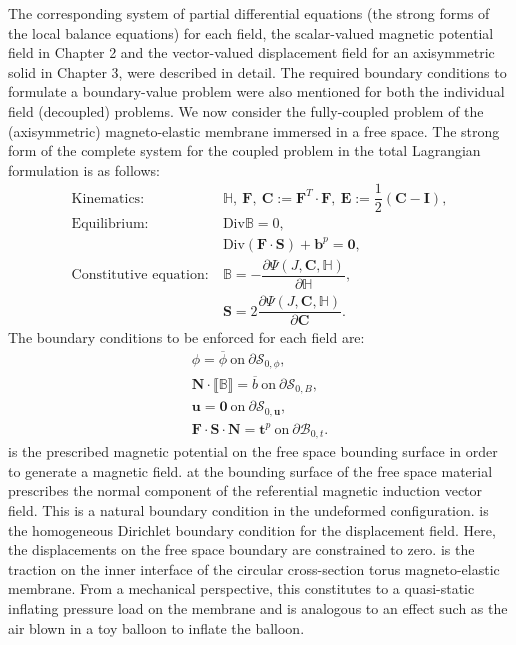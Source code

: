 The corresponding system of partial differential equations (the strong forms of the local balance equations) for each field, the scalar-valued magnetic potential field in Chapter 2 and the vector-valued displacement field for an axisymmetric solid in Chapter 3, were described in detail. The required boundary conditions to formulate a boundary-value problem were also mentioned for both the individual field (decoupled) problems. We now consider the fully-coupled problem of the (axisymmetric) magneto-elastic membrane immersed in a free space. The strong form of the complete system for the coupled problem in the total Lagrangian formulation is as follows:
\begin{align}
\text{Kinematics}:& \ \mathbb{H}, \ \mathbf{F}, \ \mathbf{C} := \mathbf{F}^T \cdot \mathbf{F}, \ \mathbf{E} := \dfrac{1}{2} (\mathbf{C} - \mathbf{I}), \label{eq:3.22.1}\\
\text{Equilibrium}:& \ \text{Div} \mathbb{B} = 0, \label{eq:3.22.2}\\
& \ \text{Div}(\mathbf{F} \cdot \mathbf{S}) + \mathbf{b}^p = \mathbf{0}, \label{eq:3.22.3}\\
\text{Constitutive equation}:& \ \mathbb{B} = -\dfrac{\partial \Psi (J, \mathbf{C}, \mathbb{H})}{\partial \mathbb{H}}, \label{eq:3.22.4}\\
& \ \mathbf{S} = 2\dfrac{\partial \Psi (J, \mathbf{C}, \mathbb{H})}{\partial \mathbf{C}}.
\label{eq:3.22.5}
\end{align}
The boundary conditions to be enforced for each field are: 
\begin{align}
\phi = \overline{\phi} \ \text{on} \ \partial \mathcal{S}_{0, \phi}, \label{eq:3.23.4} \\
\mathbf{N} \cdot \llbracket \mathbb{B} \rrbracket = \overline{b} \ \text{on} \ \partial \mathcal{S}_{0,B}, \label{eq:3.23.1}\\
\mathbf{u} = \mathbf{0} \ \text{on} \ \partial \mathcal{S}_{0, \mathbf{u}}, \label{eq:3.23.2}\\
\mathbf{F} \cdot \mathbf{S} \cdot \mathbf{N} = \mathbf{t}^p \ \text{on} \ \partial \mathcal{B}_{0, t}.
\label{eq:3.23.3}
\end{align}
 is the prescribed magnetic potential on the free space bounding surface in order to generate a magnetic field.  at the bounding surface of the free space material prescribes the normal component of the referential magnetic induction vector field. This is a natural boundary condition in the undeformed configuration.  is the homogeneous Dirichlet boundary condition for the displacement field. Here, the displacements on the free space boundary are constrained to zero.  is the traction on the inner interface of the circular cross-section torus magneto-elastic membrane. From a mechanical perspective, this constitutes to a quasi-static inflating pressure load on the membrane and is analogous to an effect such as the air blown in a toy balloon to inflate the balloon. \newline \par 

